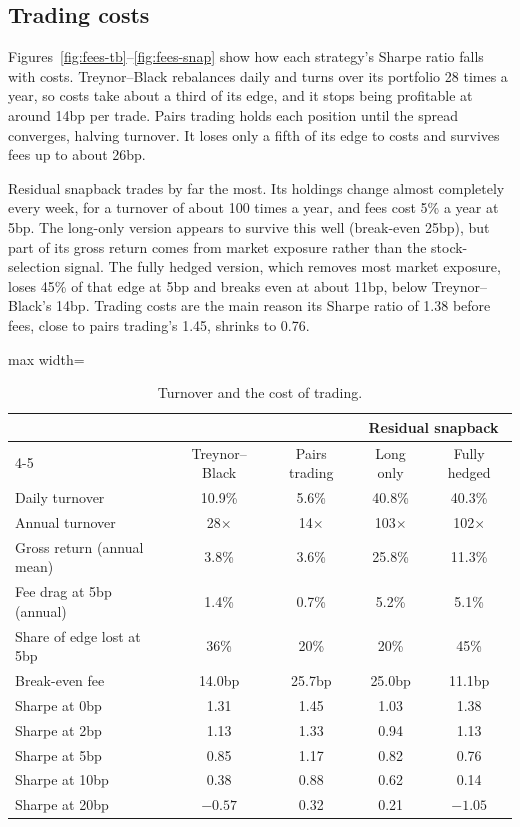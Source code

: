 \documentclass[11pt,letterpaper]{article}
\begin{document}
\subsection{Trading costs}



Figures~\ref{fig:fees-tb}--\ref{fig:fees-snap} show how each strategy's Sharpe ratio falls with costs. Treynor--Black rebalances daily and turns over its portfolio 28 times a year, so costs take about a third of its edge, and it stops being profitable at around 14bp per trade. Pairs trading holds each position until the spread converges, halving turnover. It loses only a fifth of its edge to costs and survives fees up to about 26bp.

Residual snapback trades by far the most. Its holdings change almost completely every week, for a turnover of about 100 times a year, and fees cost 5\% a year at 5bp. The long-only version appears to survive this well (break-even 25bp), but part of its gross return comes from market exposure rather than the stock-selection signal. The fully hedged version, which removes most market exposure, loses 45\% of that edge at 5bp and breaks even at about 11bp, below Treynor--Black's 14bp. Trading costs are the main reason its Sharpe ratio of 1.38 before fees, close to pairs trading's 1.45, shrinks to 0.76.







\begin{table}[!htbp]
\centering
\caption{Turnover and the cost of trading.}
\label{tab:costs}
\begin{adjustbox}{max width=\linewidth}
\begin{tabular}{lcccc}
\toprule
& & & \multicolumn{2}{c}{Residual snapback} \\
\cmidrule(lr){4-5}
& Treynor--Black & Pairs trading & Long only & Fully hedged \\
\midrule
Daily turnover & 10.9\% & 5.6\% & 40.8\% & 40.3\% \\
Annual turnover & 28$\times$ & 14$\times$ & 103$\times$ & 102$\times$ \\
Gross return (annual mean) & 3.8\% & 3.6\% & 25.8\% & 11.3\% \\
Fee drag at 5bp (annual) & 1.4\% & 0.7\% & 5.2\% & 5.1\% \\
Share of edge lost at 5bp & 36\% & 20\% & 20\% & 45\% \\
Break-even fee & 14.0bp & 25.7bp & 25.0bp & 11.1bp \\
\midrule
Sharpe at 0bp & 1.31 & 1.45 & 1.03 & 1.38 \\
Sharpe at 2bp & 1.13 & 1.33 & 0.94 & 1.13 \\
Sharpe at 5bp & 0.85 & 1.17 & 0.82 & 0.76 \\
Sharpe at 10bp & 0.38 & 0.88 & 0.62 & 0.14 \\
Sharpe at 20bp & $-0.57$ & 0.32 & 0.21 & $-1.05$ \\
\bottomrule
\end{tabular}
\end{adjustbox}
\end{table}
\end{document}
